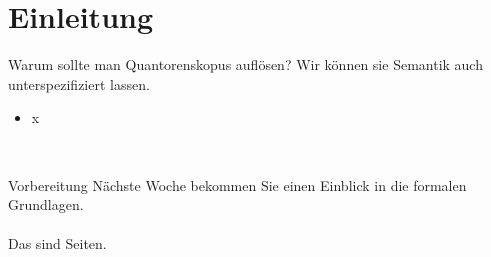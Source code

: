\section{Einleitung}

\begin{frame}
  {Warum sollte man Quantorenskopus auflösen?}
  \onslide<+->
  \onslide<+->
  Wir können sie Semantik auch unterspezifiziert lassen.\\
  \Zeile
  \begin{itemize}[<+->]
    \item x
  \end{itemize}
  \Zeile
  \onslide<+->
  \centering 
  \\
\end{frame}

\begin{frame}
  {Vorbereitung}
  \centering 
  \large
  Nächste Woche bekommen Sie einen Einblick in die formalen Grundlagen.\\
  \Zeile
  \\
  \Viertelzeile
  Das sind  Seiten.\\
\end{frame}
